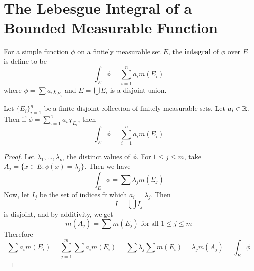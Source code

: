 \section{The Lebesgue Integral of a Bounded Measurable Function}

\begin{definition}
    For a simple function $\phi$ on a finitely measurable set $E$, the
    \textbf{integral} of $\phi$ over  $E$ is define to be
    \begin{equation*}
        \int_E{\phi}=\sum_{i=1}^n{a_im(E_i)}
    \end{equation*}
    where $\phi=\sum{a_i\chi_{E_i}}$ and $E=\bigcup{E_i}$ is a disjoint union.
\end{definition}

\begin{lemma}\label{10.1.1}
    Let $\{E_i\}_{i=1}^n$ be a finite disjoint collection of finitely measurable
    sets. Let $a_i \in \mathbb{R}$. Then if $\phi=\sum_{i=1}^n{a_i\chi_{E_i}}$, then
    \begin{equation*}
        \int_E{\phi}=\sum_{i=1}^n{a_im(E_i)}
    \end{equation*}
\end{lemma}
\begin{proof}
    Let $\lambda_1, \dots, \lambda_m$ the distinct values of $\phi$. For  $1
    \leq j \leq m$, take $A_j=\{x \in E : \phi(x)=\lambda_j\}$. Then we have
    \begin{equation*}
        \int_E{\phi}=\sum{\lambda_jm(E_j)}
    \end{equation*}
    Now, let $I_j$ be the set of indices fr which  $a_i=\lambda_j$. Then
    \begin{equation*}
        I=\bigcup{I_j}
    \end{equation*}
    is disjoint, and by additivity, we get
    \begin{equation*}
        m(A_j)=\sum{m(E_j)} \text{ for all } 1 \leq j \leq m
    \end{equation*}
    Therefore
    \begin{equation*}
        \sum{a_im(E_i)}=\sum_{j=1}^m{\sum{a_im(E_i)}}=\sum{\lambda_j\sum{m(E_i)}}
        =\lambda_jm(A_j)=\int_E{\phi}
    \end{equation*}
\end{proof}

